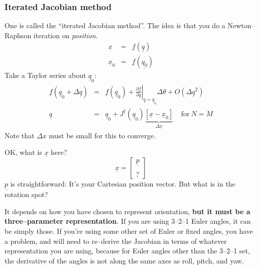 \documentclass[]{article}
\begin{document}
\subsubsection{Iterated Jacobian method}
One is called the ``iterated Jacobian method''. The idea is that you do a Newton--Raphson iteration on \textit{position}.
\begin{eqnarray}
	\underline{x} & = & \underline{f}(\underline{q}) \nonumber \\
	\underline{x}_{0} & = & \underline{f}(\underline{q_{0}}) \nonumber
\end{eqnarray}
Take a Taylor series about $\underline{q}_{0}$:
\begin{eqnarray}
	\underline{f}(\underline{q}_{0}+\Delta \underline{q}) & = & \underline{f}(\underline{q}_{0}) + \left.\frac{\partial \underline{f}}{\partial\underline{q}}\right\rvert_{\underline{q}=\underline{q}_{0}}\!\!\!\!\Delta \theta + O(\Delta \underline{q}^{2}) \nonumber \\
	\underline{q} & = & \underline{q}_{0}+J^{\dag}(\underline{q}_{0})\underbrace{\left[\underline{x}-\underline{x}_{0}\right]}_{\Delta\underline{x}}\ \ \ \ \ \text{for}\ N=M
\end{eqnarray}
Note that $\Delta x$ must be small for this to converge.

OK, what is $\underline{x}$ here? 
\begin{displaymath}
\underline{x} = \left[ \begin{array}{c} \underline{p} \\ \\? \end{array}\right]
\end{displaymath}
$\underline{p}$ is straightforward: It's your Cartesian position vector. But what is in the rotation spot?

It depends on how you have chosen to represent orientation, \textbf{but it must be a three--parameter representation}. If you are using 3--2--1 Euler angles, it can be simply those. If you're using some other set of Euler or fixed angles, you have a problem, and will need to re--derive the Jacobian in terms of whatever representation you are using, because for Euler angles other than the 3--2--1 set, the derivative of the angles is not along the same axes as roll, pitch, and yaw.
\end{document}
